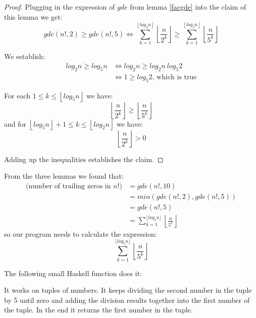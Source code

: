 \begin{proof}
Plugging in the expression of $gde$ from lemma \ref{facgde} into the claim of this lemma we get:
\begin{equation*}
   gde(n!, 2) \geq gde(n!, 5) \Leftrightarrow  \sum_{k = 1}^{\left\lfloor log_2 n\right\rfloor} \left\lfloor\frac{n}{2^k}\right\rfloor  \geq \sum_{k = 1}^{\left\lfloor log_5 n\right\rfloor} \left\lfloor\frac{n}{5^k}\right\rfloor
\end{equation*}

\noindent We establish:
\begin{equation*}
\begin{split}
   log_2 n  \geq log_5 n & \Leftrightarrow  log_2 n  \geq log_2 n\ log_5 2 \\
   & \Leftrightarrow  1 \geq  log_5 2 \text{, which is true}
\end{split}   
\end{equation*}

\noindent For each $1 \leq k \leq \left\lfloor log_5 n\right\rfloor$ we have:
\begin{equation*}
 \left\lfloor\frac{n}{2^k}\right\rfloor  \geq \left\lfloor\frac{n}{5^k}\right\rfloor
\end{equation*}
and for $\left\lfloor log_5 n\right\rfloor + 1 \leq k \leq \left\lfloor log_2 n\right\rfloor$ we have:
\begin{equation*}
 \left\lfloor\frac{n}{2^k}\right\rfloor > 0
\end{equation*}

\noindent Adding up the inequalities establishes the claim.
\end{proof}

\noindent From the three lemmas we found that:
\begin{equation*}
\begin{split}
\text{(number of trailing zeros in } n! )  & = gde(n!, 10)  \\
&= min(gde(n!, 2), gde(n!, 5))  \\
& = gde(n!, 5)  \\
& = \sum_{k = 1}^{\lfloor log_5 n \rfloor}   \left\lfloor\frac{n}{5^k}\right\rfloor
\end{split}   
\end{equation*}
\noindent so our program needs to calculate the expression:
\begin{equation*}
\sum_{k = 1}^{\lfloor log_5 n \rfloor}   \left\lfloor\frac{n}{5^k}\right\rfloor
\end{equation*}

\noindent The following small Haskell function does it:



\noindent It works on tuples of numbers. It keeps dividing the second number in the tuple by 5 until zero and adding the division results together into the first number of the tuple. In the end it returns the first number in the tuple.






